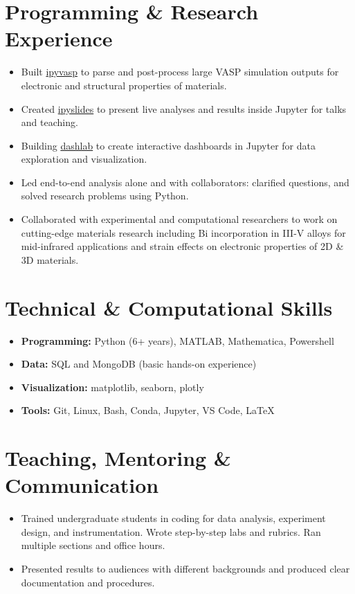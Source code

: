 \documentclass[letter,11pt]{article}
\begin{document}
\section{Programming \& Research Experience}
\begin{itemize}
    \item Built \href{https://github.com/asaboor-gh/ipyvasp}{ipyvasp} to parse and post-process large VASP simulation outputs for electronic and structural properties of materials.
    \item Created \href{https://github.com/asaboor-gh/ipyslides}{ipyslides} to present live analyses and results inside Jupyter for talks and teaching.
    \item Building \href{https://github.com/asaboor-gh/dashlab}{dashlab} to create interactive dashboards in Jupyter for data exploration and visualization.
    \item Led end-to-end analysis alone and with collaborators: clarified questions, and solved research problems using Python.
    \item Collaborated with experimental and computational researchers to work on cutting-edge materials research including Bi incorporation in III-V alloys for mid-infrared applications and strain effects on electronic properties of 2D \& 3D materials.
\end{itemize}

\section{Technical \& Computational Skills}
\begin{itemize}
    \item \textbf{Programming:} Python (6+ years), MATLAB, Mathematica, Powershell
    \item \textbf{Data:} SQL and MongoDB (basic hands-on experience)
    \item \textbf{Visualization:} matplotlib, seaborn, plotly
    \item \textbf{Tools:} Git, Linux, Bash, Conda, Jupyter, VS Code, \LaTeX
\end{itemize}

\section{Teaching, Mentoring \& Communication}
\begin{itemize}
    \item Trained undergraduate students in coding for data analysis, experiment design, and instrumentation. Wrote step-by-step labs and rubrics. Ran multiple sections and office hours.
    \item Presented results to audiences with different backgrounds and produced clear documentation and procedures.
\end{itemize}
\end{document}
